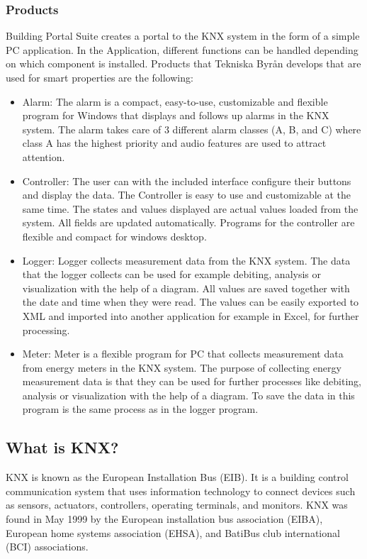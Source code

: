 \documentclass{article}
\begin{document}
\subsubsection{Products}
Building Portal Suite creates a portal to the KNX system in the form of a simple PC application. In the Application, different functions can be handled depending on which component is installed.
Products that Tekniska Byrån develops that are used for smart properties are the following:\cite{tekprod} 
\begin{itemize}
    \item Alarm: The alarm is a compact, easy-to-use, customizable and flexible program for Windows that displays and follows up alarms in the KNX system. The alarm takes care of 3 different alarm classes (A, B, and C) where class A has the highest priority and audio features are used to attract attention.\cite{tekalarm} 
    \item Controller: The user can with the included interface configure their buttons and display the data. The Controller is easy to use and customizable at the same time. The states and values displayed are actual values loaded from the system. All fields are updated automatically. Programs for the controller are flexible and compact for windows desktop.\cite{tekcontroller} 
    \item Logger: Logger collects measurement data from the KNX system. The data that the logger collects can be used for example debiting, analysis or visualization with the help of a diagram. All values are saved together with the date and time when they were read. The values can be easily exported to XML and imported into another application for example in Excel, for further processing.\cite{teklogger} 
    \item Meter: Meter is a flexible program for PC that collects measurement data from energy meters in the KNX system. The purpose of collecting energy measurement data is that they can be used for further processes like debiting, analysis or visualization with the help of a diagram. To save the data in this program is the same process as in the logger program.\cite{tekmeter} 
\end{itemize}



\subsection{What is KNX?}
KNX is known as the European Installation Bus (EIB). It is a building control communication system that uses information technology to connect devices such as sensors, actuators, controllers, operating terminals, and monitors. 
KNX was found in May 1999 by the European installation bus association (EIBA), European home systems association (EHSA), and BatiBus club international (BCI) associations.\cite{KNXLegacy}\cite{Automation} \\
\end{document}
